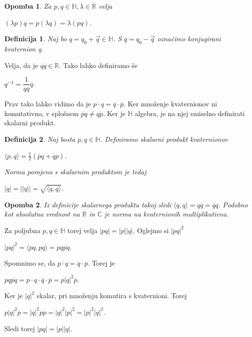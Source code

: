 \documentclass[a4paper,12pt]{article}
\def\R{\mathbb{R}} %
\def\C{\mathbb{C}} %
\def\H{\mathbb{H}} %
\newcommand{\dotpr}[2]{\langle #1, #2 \rangle}
\newtheorem{opomba}{Opomba}
\newtheorem{definicija}{Definicija}
\begin{document}
\begin{opomba}
Za $p,q \in \H, \lambda \in \R$ velja
\begin{center}
      $(\lambda p)q = p(\lambda q) = \lambda (pq)$.
\end{center}
\end{opomba}


\begin{definicija}
Naj bo $q = q_{0} + \vec{q}\in \H$. S $\overline{q} = q_{0} -\vec{q}$ označimo \emph{konjugirani kvaternion} q.
\end{definicija}
Velja, da je $q\overline{q} \in \R$. Tako lahko definiramo še 
\begin{center}
   $q^{-1} = \dfrac{1}{q\overline{q}} \overline{q}$.
\end{center}
Prav tako lahko vidimo da je $\overline{p \cdot q} = \overline{q} \cdot \overline{p}$. Ker množenje kvaternionov ni komutativno,
v splošnem $\overline{pq} \neq \overline{qp}$. Ker je $\H$ algebra, je na njej smiselno definirati skalarni produkt.

\begin{definicija}
Naj bosta $p,q \in \H$. Definiramo skalarni produkt kvaternionov
\begin{center}
   $\dotpr{p}{q} = \frac{1}{2} (\overline{p}q + \overline{q}p)$.
\end{center}
Norma porojena s skalarnim produktom je tedaj
\begin{center}
   $|q| = ||q|| = \sqrt{\dotpr{q}{q}}$.
\end{center}
\end{definicija}

\begin{opomba}
Iz definicije skalarnega produkta takoj sledi $\langle q, q\rangle = q\overline{q} = \overline{q}q$.
Podobno kot absolutna vrednost na $\R$ in $\C$ je norma na kvaternionih multiplikativna.
\end{opomba}
Za poljubna $p,q \in \H$ torej velja $|pq| = |p||q|$. Oglejmo si $|pq|^2$
\begin{center}
   $|pq|^2 = \langle pq, pq \rangle = pq\overline{pq}$.
\end{center}
Spomnimo se, da $\overline{p \cdot q} = \overline{q} \cdot \overline{p}$. Torej je
\begin{center}
   $pq\overline{pq} = p\cdot q\cdot \overline{q} \cdot \overline{p} = p |q|^2 \overline{p}$.
\end{center}
Ker je $|q|^2$ skalar, pri množenju komutira s kvaternioni. Torej
\begin{center}
   $p|q|^2\overline{p} = |q|^2p\overline{p} = |q|^2 |p|^2 = |p|^2 |q|^2$.
\end{center}
Sledi torej $|pq| = |p||q|$.
\end{document}
